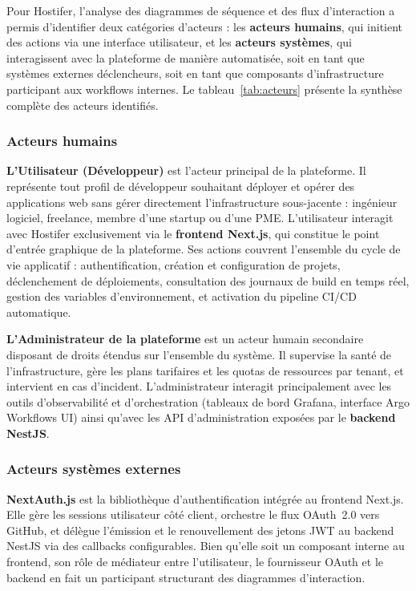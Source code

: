 Pour Hostifer, l'analyse des diagrammes de séquence et des flux d'interaction a permis d'identifier deux catégories d'acteurs : les \textbf{acteurs humains}, qui initient des actions via une interface utilisateur, et les \textbf{acteurs systèmes}, qui interagissent avec la plateforme de manière automatisée, soit en tant que systèmes externes déclencheurs, soit en tant que composants d'infrastructure participant aux workflows internes. Le tableau~\ref{tab:acteurs} présente la synthèse complète des acteurs identifiés.

\subsubsection*{Acteurs humains}

\textbf{L'Utilisateur (Développeur)} est l'acteur principal de la plateforme. Il représente tout profil de développeur souhaitant déployer et opérer des applications web sans gérer directement l'infrastructure sous-jacente : ingénieur logiciel, freelance, membre d'une startup ou d'une PME. L'utilisateur interagit avec Hostifer exclusivement via le \textbf{frontend Next.js}, qui constitue le point d'entrée graphique de la plateforme. Ses actions couvrent l'ensemble du cycle de vie applicatif : authentification, création et configuration de projets, déclenchement de déploiements, consultation des journaux de build en temps réel, gestion des variables d'environnement, et activation du pipeline CI/CD automatique.

\textbf{L'Administrateur de la plateforme} est un acteur humain secondaire disposant de droits étendus sur l'ensemble du système. Il supervise la santé de l'infrastructure, gère les plans tarifaires et les quotas de ressources par tenant, et intervient en cas d'incident. L'administrateur interagit principalement avec les outils d'observabilité et d'orchestration (tableaux de bord Grafana, interface Argo Workflows UI) ainsi qu'avec les API d'administration exposées par le \textbf{backend NestJS}.

\subsubsection*{Acteurs systèmes externes}

\textbf{NextAuth.js} est la bibliothèque d'authentification intégrée au frontend Next.js. Elle gère les sessions utilisateur côté client, orchestre le flux OAuth~2.0 vers GitHub, et délègue l'émission et le renouvellement des jetons JWT au backend NestJS via des callbacks configurables. Bien qu'elle soit un composant interne au frontend, son rôle de médiateur entre l'utilisateur, le fournisseur OAuth et le backend en fait un participant structurant des diagrammes d'interaction.

